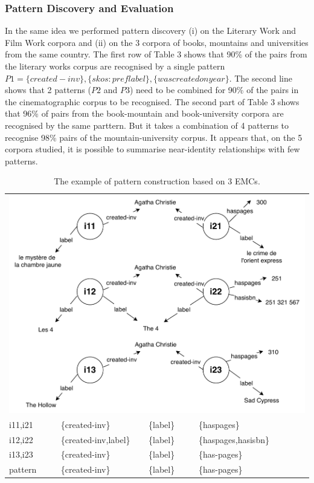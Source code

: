 \documentclass[runningheads]{llncs}
\begin{document}
\subsubsection{Pattern Discovery and Evaluation}
In the same idea we performed pattern discovery (i) on the Literary Work and Film Work corpora and (ii) on the 3 corpora of books, mountains and universities from the same country. The first row of Table 3 shows that 90\% of the pairs from the literary works corpus are recognised by a single pattern $P1=\{created-inv\},\{skos:preflabel\},\{wascreatedonyear\}$. The second line shows that 2 patterns ($P2$ and $P3$) need to be combined for 90\% of the pairs in the cinematographic corpus to be recognised. The second part of Table 3 shows that 96\% of pairs from the book-mountain and book-university corpora are recognised by the same parttern. But it takes a combination of 4 patterns to recognise 98\% pairs of the mountain-university corpus.
It appears that, on the 5 corpora studied, it is possible to summarise near-identity relationships with few patterns. 

\begin{table}[]
    \centering
    \begin{tabular}{llll}
        \multicolumn{4}{l}{\includegraphics[scale=0.7]{./agatha.pdf}} \\
         i11,i21 & \{created-inv\}& \{label\}&\{haspages\} \\
         i12,i22 & \{created-inv,label\}&\{label\} &\{haspages,hasisbn\} \\
         i13,i23 & \{created-inv\}&\{label\}&\{has-pages\}\\
        \hline
        
        pattern & \{created-inv\}&\{label\}&\{has-pages\} \\
        
    \end{tabular}
    \caption{The example of pattern construction based on 3 EMCs.}
    \label{tab:pattern_example}
\end{table}
\end{document}
